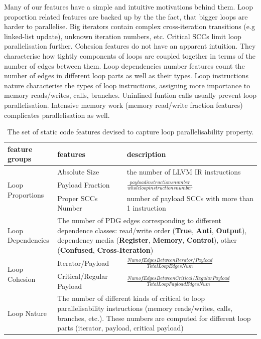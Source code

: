 \documentclass[sigconf,10pt,review,anonymous]{acmart}
\begin{document}
\quad Many of our features have a simple and intuitive motivations behind them. Loop proportion related features are backed up by the the fact, that bigger loops are harder to parallelise. Big iterators contain complex cross-iteration transitions (e.g linked-list update), unknown iteration numbers, etc. Critical SCCs limit loop parallelisation further. Cohesion features do not have an apparent intuition. They characterise how tightly components of loops are coupled together in terms of the number of edges between them. Loop dependencies number features count the number of edges in different loop parts as well as their types. Loop instructions nature characterise the types of loop instructions, assigning more importance to memory reads/writes, calls, branches. Uninlined funtion calls usually prevent loop parallelisation. Intensive memory work (memory read/write fraction features) complicates parallelisation as well.   

\begin{table}[h!]
    \centering
    \begin{tabular}[c]{|p{2.5cm}|p{4.0cm}|p{9.0cm}|}
        \hline
        feature groups & features & description\\
        \hline
        \multirow{3}{2.5cm}{Loop Proportions} & Absolute Size & the number of LLVM IR instructions\\\cline{2-3}
        & Payload Fraction & $\frac{payload instructions number}{whole loop instructions number}$\\\cline{2-3}
        & Proper SCCs Number & number of payload SCCs with more than 1 instruction\\\cline{2-3}
        \hline
        Loop Dependencies & \multicolumn{2}{|p{13.0cm}|}{The number of PDG edges corresponding to different dependence classes: read/write order (\textbf{True}, \textbf{Anti}, \textbf{Output}), dependency media (\textbf{Register}, \textbf{Memory}, \textbf{Control}), other (\textbf{Confused}, \textbf{Cross-Iteration})} \\
        \hline
        \multirow{2}{2.5cm}{Loop Cohesion} & Iterator/Payload & $\frac{Num of Edges Between Iterator/Payload}{Total Loop Edges Num}$\\\cline{2-3}
        & Critical/Regular Payload & $\frac{Num of Edges Between Critical/Regular Payload}{Total Loop Payload Edges Num}$\\
        \hline      
        Loop Nature & \multicolumn{2}{|p{13.0cm}|}{The number of different kinds of critical to loop parallelisability instructions (memory reads/writes, calls, branches, etc.). These numbers are computed for different loop parts (iterator, payload, critical payload)} \\
        \hline

    \end{tabular}
    \caption{The set of static code features devised to capture loop parallelisability property.}
    \label{tab:loop_features}
\end{table}
\end{document}
